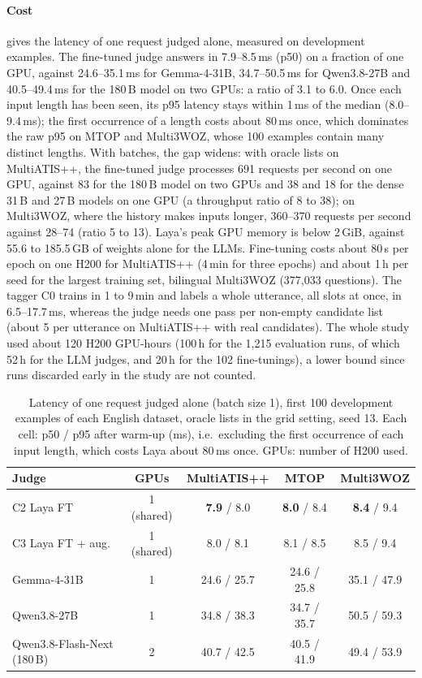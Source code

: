 \paragraph{Cost}  gives the latency of one request judged alone, measured on development examples. The fine-tuned judge answers in 7.9--8.5\,ms (p50) on a fraction of one GPU, against 24.6--35.1\,ms for Gemma-4-31B, 34.7--50.5\,ms for Qwen3.8-27B and 40.5--49.4\,ms for the 180\,B model on two GPUs: a ratio of 3.1 to 6.0. Once each input length has been seen, its p95 latency stays within 1\,ms of the median (8.0--9.4\,ms); the first occurrence of a length costs about 80\,ms once, which dominates the raw p95 on MTOP and Multi3WOZ, whose 100 examples contain many distinct lengths. With batches, the gap widens: with oracle lists on MultiATIS++, the fine-tuned judge processes 691 requests per second on one GPU, against 83 for the 180\,B model on two GPUs and 38 and 18 for the dense 31\,B and 27\,B models on one GPU (a throughput ratio of 8 to 38); on Multi3WOZ, where the history makes inputs longer, 360--370 requests per second against 28--74 (ratio 5 to 13). Laya's peak GPU memory is below 2\,GiB, against 55.6 to 185.5\,GB of weights alone for the LLMs. Fine-tuning costs about 80\,s per epoch on one H200 for MultiATIS++ (4\,min for three epochs) and about 1\,h per seed for the largest training set, bilingual Multi3WOZ (377,033 questions). The tagger C0 trains in 1 to 9\,min and labels a whole utterance, all slots at once, in 6.5--17.7\,ms, whereas the judge needs one pass per non-empty candidate list (about 5 per utterance on MultiATIS++ with real candidates). The whole study used about 120 H200 GPU-hours (100\,h for the 1,215 evaluation runs, of which 52\,h for the LLM judges, and 20\,h for the 102 fine-tunings), a lower bound since runs discarded early in the study are not counted.

\begin{table}[pos=t]
\centering
\small
\caption{Latency of one request judged alone (batch size 1), first 100 development examples of each English dataset, oracle lists in the grid setting, seed 13. Each cell: p50 / p95 after warm-up (ms), i.e.\ excluding the first occurrence of each input length, which costs Laya about 80\,ms once. GPUs: number of H200 used.}
\label{tab:latency}
\begin{tabular}{@{}lcccc@{}}
\toprule
Judge & GPUs & MultiATIS++ & MTOP & Multi3WOZ \\
\midrule
C2 Laya FT & 1 (shared) & \textbf{7.9} / 8.0 & \textbf{8.0} / 8.4 & \textbf{8.4} / 9.4 \\
C3 Laya FT + aug. & 1 (shared) & 8.0 / 8.1 & 8.1 / 8.5 & 8.5 / 9.4 \\
Gemma-4-31B & 1 & 24.6 / 25.7 & 24.6 / 25.8 & 35.1 / 47.9 \\
Qwen3.8-27B & 1 & 34.8 / 38.3 & 34.7 / 35.7 & 50.5 / 59.3 \\
Qwen3.8-Flash-Next (180\,B) & 2 & 40.7 / 42.5 & 40.5 / 41.9 & 49.4 / 53.9 \\
\bottomrule
\end{tabular}
\end{table}

